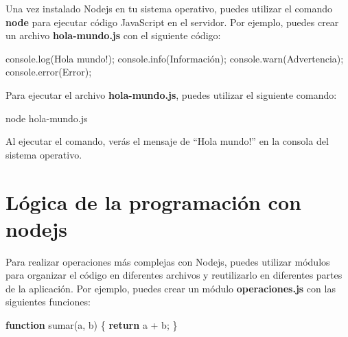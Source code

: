 \documentclass[
  a4paper,
  DIV=11,
  numbers=noendperiod,
  onepage,
  openany]{scrreprt}
\newenvironment{Shaded}{\begin{snugshade}}{\end{snugshade}}
\newcommand{\BuiltInTok}[1]{\textcolor[rgb]{0.00,0.23,0.31}{#1}}
\newcommand{\ControlFlowTok}[1]{\textcolor[rgb]{0.00,0.23,0.31}{\textbf{#1}}}
\newcommand{\ExtensionTok}[1]{\textcolor[rgb]{0.00,0.23,0.31}{#1}}
\newcommand{\FunctionTok}[1]{\textcolor[rgb]{0.28,0.35,0.67}{#1}}
\newcommand{\KeywordTok}[1]{\textcolor[rgb]{0.00,0.23,0.31}{\textbf{#1}}}
\newcommand{\NormalTok}[1]{\textcolor[rgb]{0.00,0.23,0.31}{#1}}
\newcommand{\OperatorTok}[1]{\textcolor[rgb]{0.37,0.37,0.37}{#1}}
\newcommand{\StringTok}[1]{\textcolor[rgb]{0.13,0.47,0.30}{#1}}
\begin{document}
\begin{tcolorbox}
Una vez instalado Nodejs en tu sistema operativo, puedes utilizar el
comando \textbf{node} para ejecutar código JavaScript en el servidor.
Por ejemplo, puedes crear un archivo \textbf{hola-mundo.js} con el
siguiente código:

\begin{Shaded}
\begin{Highlighting}[]
\BuiltInTok{console}\OperatorTok{.}\FunctionTok{log}\NormalTok{(}\StringTok{\textquotesingle{}Hola mundo!\textquotesingle{}}\NormalTok{)}\OperatorTok{;}
\BuiltInTok{console}\OperatorTok{.}\FunctionTok{info}\NormalTok{(}\StringTok{\textquotesingle{}Información\textquotesingle{}}\NormalTok{)}\OperatorTok{;}
\BuiltInTok{console}\OperatorTok{.}\FunctionTok{warn}\NormalTok{(}\StringTok{\textquotesingle{}Advertencia\textquotesingle{}}\NormalTok{)}\OperatorTok{;}
\BuiltInTok{console}\OperatorTok{.}\FunctionTok{error}\NormalTok{(}\StringTok{\textquotesingle{}Error\textquotesingle{}}\NormalTok{)}\OperatorTok{;}
\end{Highlighting}
\end{Shaded}

Para ejecutar el archivo \textbf{hola-mundo.js}, puedes utilizar el
siguiente comando:

\begin{Shaded}
\begin{Highlighting}[]
\ExtensionTok{node}\NormalTok{ hola{-}mundo.js}
\end{Highlighting}
\end{Shaded}

Al ejecutar el comando, verás el mensaje de ``Hola mundo!'' en la
consola del sistema operativo.

\chapter{Lógica de la programación con
nodejs}\label{luxf3gica-de-la-programaciuxf3n-con-nodejs}

Para realizar operaciones más complejas con Nodejs, puedes utilizar
módulos para organizar el código en diferentes archivos y reutilizarlo
en diferentes partes de la aplicación. Por ejemplo, puedes crear un
módulo \textbf{operaciones.js} con las siguientes funciones:

\begin{Shaded}
\begin{Highlighting}[]
\KeywordTok{function} \FunctionTok{sumar}\NormalTok{(a}\OperatorTok{,}\NormalTok{ b) \{}
  \ControlFlowTok{return}\NormalTok{ a }\OperatorTok{+}\NormalTok{ b}\OperatorTok{;}
\NormalTok{\}}


\end{Highlighting}
\end{Shaded}
\end{tcolorbox}
\end{document}
